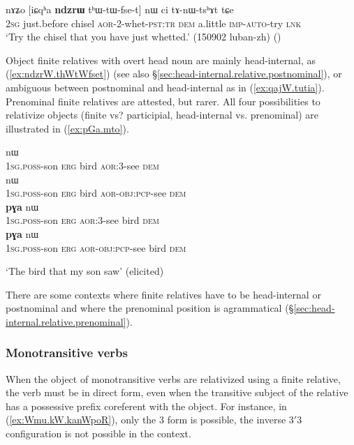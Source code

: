 \begin{exe}
\ex \label{ex:ndzrW.thWtWfset}
\gll nɤʑo [iɕqʰa \textbf{ndzrɯ} tʰɯ-tɯ-fse-t] nɯ ci tɤ-nɯ-tsʰɤt tɕe\\
\textsc{2sg} just.before chisel \textsc{aor}-2-whet-\textsc{pst}:\textsc{tr} \textsc{dem} a.little \textsc{imp}-\textsc{auto}-try \textsc{lnk}\\
\glt `Try the chisel that you have just whetted.' (150902 luban-zh)
()
\end{exe}


Object finite relatives with overt head noun are mainly head-internal, as (\ref{ex:ndzrW.thWtWfset}) (see also §\ref{sec:head-internal.relative.postnominal}), or ambiguous between postnominal and head-internal as in (\ref{ex:qajW.tutia}). Prenominal finite relatives are attested, but rarer. All four possibilities to relativize objects (finite vs? participial, head-internal vs. prenominal) are illustrated in (\ref{ex:pGa.mto}).

\begin{exe}
\ex \label{ex:pGa.mto}
\begin{xlist}
\ex \label{ex:pGa.pamto}
 nɯ \\
\textsc{1sg}.\textsc{poss}-son \textsc{erg} bird \textsc{aor}:3\flobv{}-see \textsc{dem} \\
\ex \label{ex:pGa.pWkAmto}
 nɯ \\
\textsc{1sg}.\textsc{poss}-son \textsc{erg} bird \textsc{aor}-\textsc{obj}:\textsc{pcp}-see \textsc{dem} \\
\ex \label{ex:pamto.pGa}
 \textbf{pɣa} nɯ \\
\textsc{1sg}.\textsc{poss}-son \textsc{erg}  \textsc{aor}:3\flobv{}-see bird \textsc{dem} \\
\ex \label{ex:pWkAmto.pGa}
 \textbf{pɣa} nɯ \\
\textsc{1sg}.\textsc{poss}-son \textsc{erg}  \textsc{aor}-\textsc{obj}:\textsc{pcp}-see bird \textsc{dem} \\
\end{xlist}
\glt `The bird that my son saw' (elicited)
\end{exe}

There are some contexts where finite relatives have to be head-internal or postnominal and where the prenominal position is agrammatical (§\ref{sec:head-internal.relative.prenominal}). 


\subsubsection{Monotransitive verbs} \label{sec:monotransitive.object.relativization}
When the object of monotransitive verbs are relativized using a finite relative, the verb must be in direct form, even when the transitive subject of the relative has a possessive prefix coreferent with the object. For instance, in (\ref{ex:Wmu.kW.kanWpoR}), only the 3\flobv{} form  is possible, the inverse 3$'$\fl{}3 configuration  is not possible in the context. 

